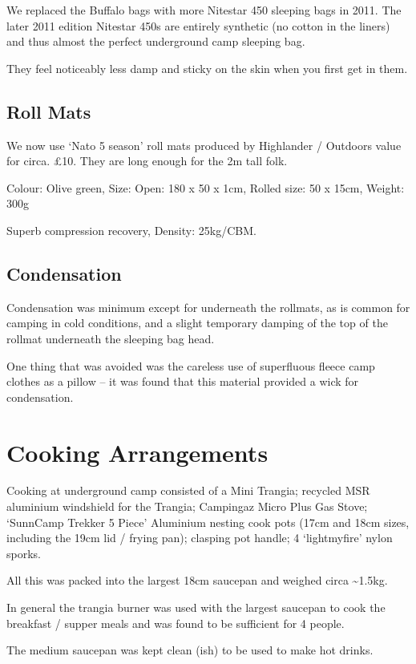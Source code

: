 We replaced the Buffalo bags with more Nitestar 450 sleeping bags in 2011. The later 2011 edition Nitestar 450s are entirely synthetic (no cotton in the liners) and thus almost the perfect underground camp sleeping bag.

They feel noticeably less damp and sticky on the skin when you first get in them.


\subsection{Roll Mats}

We now use `Nato 5 season' roll mats produced by Highlander / Outdoors value for circa. £10. They are long enough for the 2m tall folk.

Colour: Olive green, Size: Open: 180 x 50 x 1cm, Rolled size: 50 x 15cm, Weight: 300g

Superb compression recovery, Density: 25kg/CBM.


\subsection{Condensation}

Condensation was minimum except for underneath the rollmats, as is common for camping in cold conditions, and a slight temporary damping of the top of the rollmat underneath the sleeping bag head.

One thing that was avoided was the careless use of superfluous fleece camp clothes as a pillow -- it was found that this material provided a wick for condensation.


\section{Cooking Arrangements}

Cooking at underground camp consisted of a Mini Trangia; recycled MSR aluminium windshield for the Trangia; Campingaz Micro Plus Gas Stove; `SunnCamp Trekker 5 Piece' Aluminium nesting cook pots (17cm and 18cm sizes, including the 19cm lid / frying pan); clasping pot handle; 4 `lightmyfire' nylon sporks.

All this was packed into the largest 18cm saucepan and weighed circa \textasciitilde{}1.5kg.

In general the trangia burner was used with the largest saucepan to cook the breakfast / supper meals and was found to be sufficient for 4 people.

The medium saucepan was kept clean (ish) to be used to make hot drinks.

